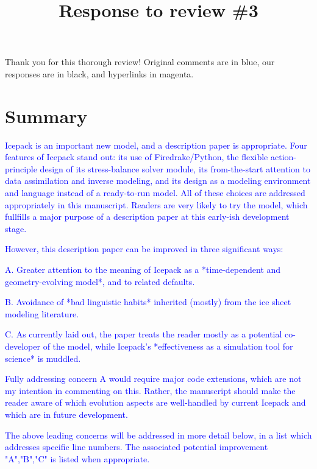 \documentclass{article}
\theoremstyle{definition}
\theoremstyle{plain}
\begin{document}
\title{Response to review \#3}
\author{}
\date{}

\maketitle

Thank you for this thorough review!
Original comments are in blue, our responses are in black, and hyperlinks in magenta.

\section*{Summary}

\textcolor{blue}{Icepack is an important new model, and a description paper is appropriate.  Four features of Icepack stand out: its use of Firedrake/Python, the flexible action-principle design of its stress-balance solver module, its from-the-start attention to data assimilation and inverse modeling, and its design as a modeling environment and language instead of a ready-to-run model.  All of these choices are addressed appropriately in this manuscript.  Readers are very likely to try the model, which fullfills a major purpose of a description paper at this early-ish development stage.}

\textcolor{blue}{However, this description paper can be improved in three significant ways:}

\textcolor{blue}{A.  Greater attention to the meaning of Icepack as a *time-dependent and geometry-evolving model*, and to related defaults.}

\textcolor{blue}{B.  Avoidance of *bad linguistic habits* inherited (mostly) from the ice sheet modeling literature.}

\textcolor{blue}{C.  As currently laid out, the paper treats the reader mostly as a potential co-developer of the model, while Icepack's *effectiveness as a simulation tool for science* is muddled.}

\textcolor{blue}{Fully addressing concern A would require major code extensions, which are not my intention in commenting on this.  Rather, the manuscript should make the reader aware of which evolution aspects are well-handled by current Icepack and which are in future development.}

\textcolor{blue}{The above leading concerns will be addressed in more detail below, in a list which addresses specific line numbers.  The associated potential improvement "A","B","C" is listed when appropriate.}
\end{document}
